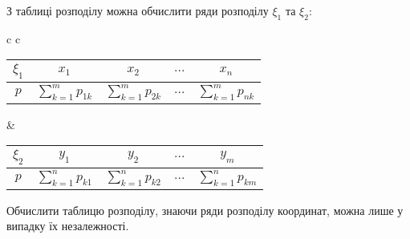 З таблиці розподілу можна обчислити ряди розподілу $\xi_1$ та $\xi_2$:
\begin{center}
    \begin{tabular}{c c}
        \begin{tabular}{|c|c|c|c|c|}
            \hline
            $\xi_1$ & $x_1$ & $x_2$ & $...$ & $x_n$ \\
            \hline
            $p$ & $\sum\limits_{k=1}^m p_{1k}$ & $\sum\limits_{k=1}^m p_{2k}$ & $...$ & $\sum\limits_{k=1}^m p_{nk}$ \\
            \hline
        \end{tabular} &
        \begin{tabular}{|c|c|c|c|c|}
            \hline
            $\xi_2$ & $y_1$ & $y_2$ & $...$ & $y_m$ \\
            \hline
            $p$ & $\sum\limits_{k=1}^n p_{k1}$ & $\sum\limits_{k=1}^n p_{k2}$ & $...$ & $\sum\limits_{k=1}^n p_{km}$ \\
            \hline
        \end{tabular}
    \end{tabular}
\end{center}

\begin{remark}
    Обчислити таблицю розподілу, знаючи ряди розподілу координат, можна лише у випадку їх незалежності.
\end{remark}

